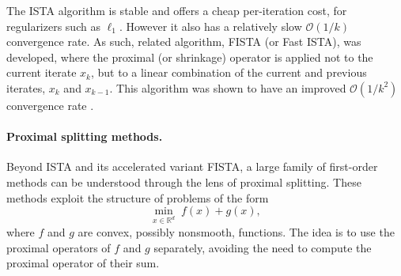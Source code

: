 \documentclass[11pt, twoside]{report}
\newtheorem{lemma}[theorem]{Lemma}
\begin{document}

The ISTA algorithm is stable and offers a cheap per-iteration cost, for regularizers such as $\ell_1$. However it also has a relatively slow $\mathcal{O}(1/k)$ convergence rate. As such, related algorithm, FISTA (or Fast ISTA), was developed, where the proximal (or shrinkage) operator is applied not to the current iterate $x_k$, but to a linear combination of the current and previous iterates, $x_k$ and $x_{k-1}$. This algorithm was shown to have an improved $\mathcal{O}(1/k^2)$ convergence rate \cite{beck2009fista}.

\paragraph{Proximal splitting methods.} 
Beyond ISTA and its accelerated variant FISTA, a large family of first-order methods can be understood through the lens of proximal splitting. These methods exploit the structure of problems of the form
\[
    \min_{x \in \mathbb{R}^d} \; f(x) + g(x),
\]
where $f$ and $g$ are convex, possibly nonsmooth, functions. The idea is to use the proximal operators of $f$ and $g$ separately, avoiding the need to compute the proximal operator of their sum.
\end{document}
